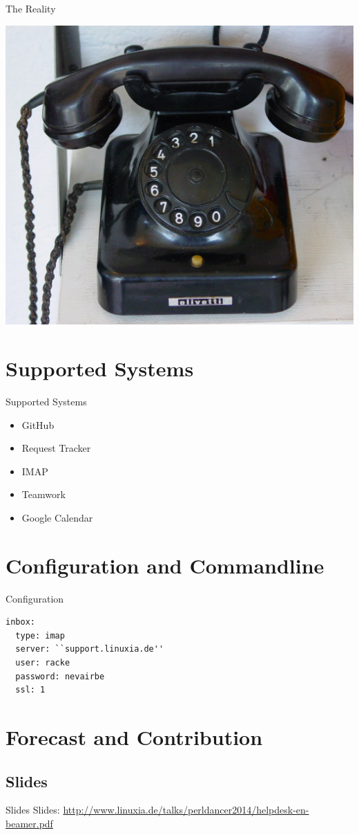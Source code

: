 \begin{frame}{The Reality}
\begin{center}
  \includegraphics[width=\textwidth,height=1\textheight,keepaspectratio]{pics/phone.jpg}
\end{center}
\end{frame}

\section{Supported Systems}

\begin{frame}{Supported Systems}
\begin{itemize}
\item GitHub
\item Request Tracker
\item IMAP
\item Teamwork
\item Google Calendar
\end{itemize}
\end{frame}

\section{Configuration and Commandline}
\begin{frame}[fragile]{Configuration}
\begin{lstlisting}
inbox:
  type: imap
  server: ``support.linuxia.de''
  user: racke
  password: nevairbe
  ssl: 1
\end{lstlisting}
\end{frame}

\section{Forecast and Contribution}

\subsection{Slides}

\begin{frame}{Slides}
Slides:
\url{http://www.linuxia.de/talks/perldancer2014/helpdesk-en-beamer.pdf}
\end{frame}



